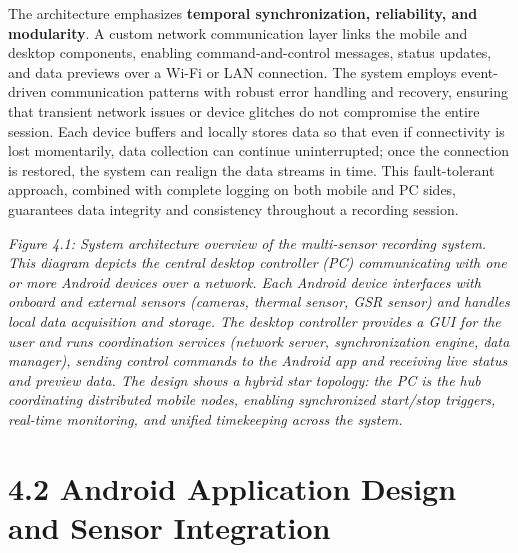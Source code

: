 \documentclass[11pt,a4paper]{report}
\begin{document}


The architecture emphasizes \textbf{temporal synchronization, reliability, and
modularity}. A custom network communication layer links the mobile and
desktop components, enabling command-and-control messages, status
updates, and data previews over a Wi-Fi or LAN connection. The system
employs event-driven communication patterns with robust error handling
and recovery, ensuring that transient network issues or device glitches
do not compromise the entire
session\cite{AppleHealthWatch2019}.
Each device buffers and locally stores data so that even if connectivity
is lost momentarily, data collection can continue uninterrupted; once
the connection is restored, the system can realign the data streams in
time\cite{SamsungHealth2020}.
This fault-tolerant approach, combined with complete logging on
both mobile and PC sides, guarantees data integrity and consistency
throughout a recording session.

\textit{Figure 4.1: System architecture overview of the multi-sensor recording
system. This diagram depicts the central} \textit{desktop controller} \textit{(PC)
communicating with one or more} \textit{Android devices} \textit{over a network. Each
Android device interfaces with onboard and external sensors (cameras,
thermal sensor, GSR sensor) and handles local data acquisition and
storage. The desktop controller provides a GUI for the user and runs
coordination services (network server, synchronization engine, data
manager), sending control commands to the Android app and receiving live
status and preview data. The design shows a} \textit{hybrid star topology: the
PC is the hub coordinating distributed mobile nodes, enabling
synchronized start/stop triggers, real-time monitoring, and unified
timekeeping across the system.}

\section{4.2 Android Application Design and Sensor Integration}
\end{document}

